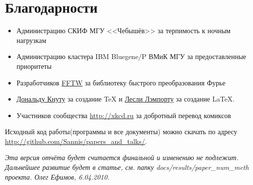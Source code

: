 \section{Благодарности}

\begin{itemize}
  \item Администрацию СКИФ МГУ <<Чебышёв>> за терпимость к ночным нагрузкам
  \item Администрацию кластера IBM Bluegene/P ВМиК МГУ за предоставленные приоритеты
  \item Разработчиков \href{http://fftw.org}{FFTW} за библиотеку быстрого преобразования Фурье
  \item \href{http://en.wikipedia.org/wiki/Donald\_Knuth}{Дональду Кнуту} за создание {\TeX} и  \href{http://en.wikipedia.org/wiki/Leslie\_Lamport}{Лесли Лэмпорту} за создание {\LaTeX}.
  \item Участников сообщества \url{http://xkcd.ru} за добротный перевод комиксов
\end{itemize}

Исходный код работы(программы и все документы) можно скачать по адресу \\
\url{http://github.com/Sannis/papers_and_talks/}.

\textit{Эта версия отчёта будет считается финальной и изменению не подлежит.
Дальнейшее развитие будет в статье, см. папку docs/results/paper\_num\_meth проекта.
Олег Ефимов, 6.04.2010.}
